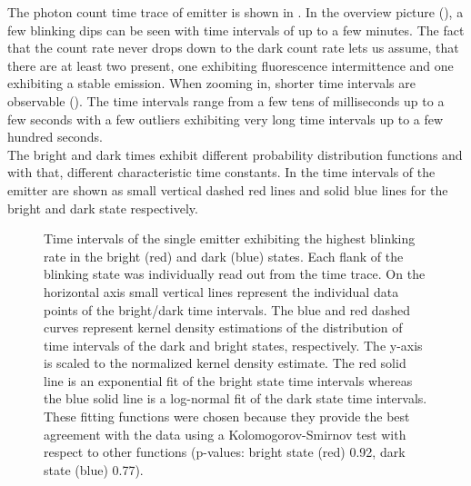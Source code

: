 		The photon count time trace of emitter \emnarrow is shown in .
		In the overview picture (), a few blinking dips can be seen with time intervals of up to a few minutes.
		The fact that the count rate never drops down to the dark count rate lets us assume, that there are at least two \sivs present, one exhibiting fluorescence intermittence and one exhibiting a stable emission.
		When zooming in, shorter time intervals are observable ().
		The time intervals range from a few tens of milliseconds up to a few seconds with a few outliers exhibiting very long time intervals up to a few hundred seconds.
		\\
		The bright and dark times exhibit different probability distribution functions and with that, different characteristic time constants.
		In  the time intervals of the emitter are shown as small vertical dashed red lines and solid blue lines for the bright and dark state respectively.

		\begin{figure}[!htb]
			\centering
			\caption[Distributions of brigth and dark state intervals]{Time intervals of the single emitter exhibiting the highest blinking rate in the bright (red) and dark (blue) states. Each flank of the blinking state was individually read out from the \pl time trace. On the horizontal axis small vertical lines represent the individual data points of the bright/dark time intervals. The blue and red dashed curves represent kernel density estimations of the distribution of time intervals of the dark and bright states, respectively. The y-axis is scaled to the normalized kernel density estimate. The red solid line is an exponential fit of the bright state time intervals whereas the blue solid line is a log-normal fit of the dark state time intervals. These fitting functions were chosen because they provide the best agreement with the data using a Kolomogorov-Smirnov test with respect to other functions (p-values: bright state (red) 0.92, dark state (blue) 0.77).}
			\label{fig::fit_blink_distr}
		\end{figure}

